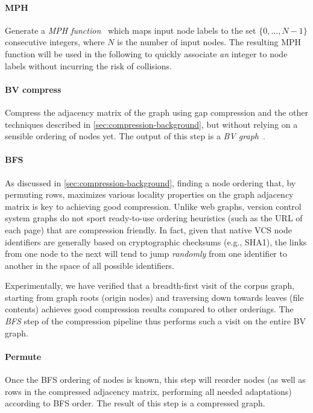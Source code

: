 \paragraph{MPH}
Generate a \emph{\gls{MPH} function}~\cite{GOVFSCF} which maps input
node labels to the set $\{0,\ldots,N-1\}$ consecutive integers, where $N$ is
the number of input nodes. The resulting \gls{MPH} function will be used in the
following to quickly associate \emph{an} integer to node labels without
incurring the risk of collisions.

\paragraph{BV compress}
Compress the adjacency matrix of the graph using gap compression and the other
techniques described in \cref{sec:compression-background}, but without
relying on a sensible ordering of nodes yet. The output of this step is a
\emph{BV graph}~\cite{BoVWFI}.

\paragraph{BFS}
As discussed in \cref{sec:compression-background}, finding a node
ordering that, by permuting rows, maximizes various locality properties on the
graph adjacency matrix is key to achieving good compression. Unlike web
graphs, version control system graphs do not sport ready-to-use ordering
heuristics (such as the URL of each page) that are compression friendly. In
fact, given that native VCS node identifiers are generally based on
cryptographic checksums (e.g., SHA1), the links from one node to the next will
tend to jump \emph{randomly} from one identifier to another in the space of all
possible identifiers.

Experimentally, we have verified that a breadth-first visit of the corpus graph,
starting from graph roots (origin nodes) and traversing down towards leaves
(file contents) achieves good compression results compared to other orderings.
The \emph{BFS} step of the compression pipeline thus performs such a visit on
the entire BV graph.

\paragraph{Permute}
Once the BFS ordering of nodes is known, this step will reorder nodes (as well
as rows in the compressed adjacency matrix, performing all needed adaptations)
according to BFS order. The result of this step is a compressed graph.

